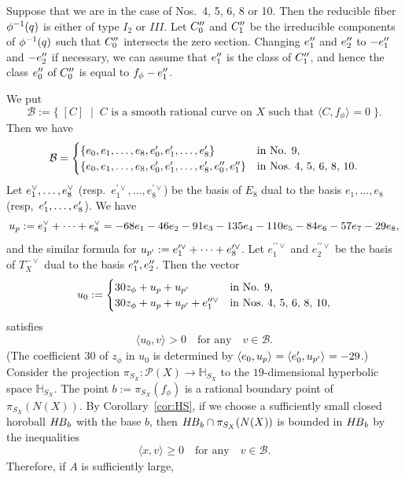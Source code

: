 \documentclass{amsart}
\theoremstyle{plain}
\theoremstyle{definition}
\theoremstyle{remark}
\numberwithin{equation}{section}
\numberwithin{table}{section}
\numberwithin{figure}{section}
\renewcommand{\H}{\mathord{\mathbb H}}
\newcommand{\BBB}{\mathord{\mathcal B}}
\newcommand{\PPP}{\mathord{\mathcal P}}
\newcommand{\set}[2]{\{\; {#1} \; \mid \; {#2} \;  \}}
\newcommand{\inv}{\sp{-1}}
\newcommand{\sprime}{\sp\prime}
\newcommand{\spprime}{\sp{\prime\prime}}
\newcommand{\dual}{\sp{\vee}}
\newcommand{\intM}[2]{\langle{#1}\rangle_{#2}}
\newcommand{\HB}{\mathord{H\hskip -1pt B}}
\newcommand{\Nc}{N}
\begin{document}
Suppose that we are in the case of  Nos.~4, 5, 6, 8 or 10.
Then the reducible fiber $\phi\inv (q)$ is either of type $I_2$ or $III$.
Let $C_0\spprime$ and $C_1\spprime$ be the irreducible components of $\phi\inv (q)$
such that $C_0\spprime$ intersects the zero section.
Changing $e_1\spprime$ and $e_2\spprime$ to $-e_1\spprime$ and $-e_2\spprime$ if necessary,
we can assume that $e_1\spprime$ is the class of $C_1\spprime$,
and hence the class $e_0\spprime$  of $C_0\spprime$ is equal to $f_{\phi}-e_1\spprime$.
%
\par
We put
$$
\BBB:=\set{[C]}{\textrm{$C$ is a smooth rational curve on $X$ such that $\intM{C, f_{\phi}}{}=0$}}.
$$
Then we have
$$
\BBB=
\begin{cases} 
 \{e_0, e_1, \dots, e_8, e_0\sprime, e_1\sprime, \dots, e_8\sprime\} & \textrm{in No. 9}, \\
 \{e_0, e_1, \dots, e_8, e_0\sprime, e_1\sprime, \dots, e_8\sprime, e_0\spprime, e_1\spprime\} & \textrm{in Nos.~4, 5, 6, 8, 10}.
\end{cases}
$$
Let $e_1\dual, \dots, e_8\dual$ (resp.~$e_1^{\prime\vee}, \dots, e_8^{\prime\vee}$)
be the  basis of $E_8$ dual to the basis
$e_1, \dots, e_8$ (resp,~$e_1\sprime, \dots, e_8\sprime$).
We have 
$$
u_p:=e_1\dual+ \cdots+ e_8\dual=-68 e_1-46 e_2- 91 e_3 -135 e_4 - 110 e_5 - 84 e_6- 57 e_7 - 29 e_8,
$$
and the similar formula for $u_{p\sprime}:=e_1^{\prime\vee}+ \cdots+ e_8^{\prime\vee}$.
Let $e_1^{\prime\prime\vee}$ and  $e_2^{\prime\prime\vee}$ be the basis of $T_X^{-\vee}$ dual to the basis $e_1\spprime, e_2\spprime$.
Then the  vector
$$
u_0:=
\begin{cases}
30 z_{\phi} +u_p +u_{p\sprime} & \textrm{in No. 9}, \\
30 z_{\phi} +u_p +u_{p\sprime} + e_1^{\prime\prime\vee} & \textrm{in Nos.~4, 5, 6, 8, 10}, 
\end{cases}
$$
satisfies
$$
\intM{u_0, v}{}>0\quad\textrm{for any}\quad v\in \BBB.
$$
(The coefficient $30$ of $z_{\phi}$ in $u_0$ is determined by  $\intM{e_0, u_p}{}=\intM{e_0\sprime, u_{p\sprime}}{}=-29$.)
Consider the projection
$\pi_{S_X}\colon  \PPP(X)\to \H_{S_X}$
to the $19$-dimensional hyperbolic space $\H_{S_X}$.
The point $b:=\pi_{S_X}(f_{\phi})$ is a rational boundary point of $\pi_{S_X}(\Nc(X))$.
By Corollary~\ref{cor:HS},
if we choose a sufficiently small closed horoball $\HB_{b}$ with the base $b$,
then $\HB_{b}\cap \pi_{S_X}(\Nc(X))$
is bounded in $\HB_b$ by the inequalities
$$
\intM{x, v}{}\ge 0
\quad\textrm{for any}\quad v\in \BBB.
$$
Therefore, if $A$ is sufficiently large,
\end{document}

